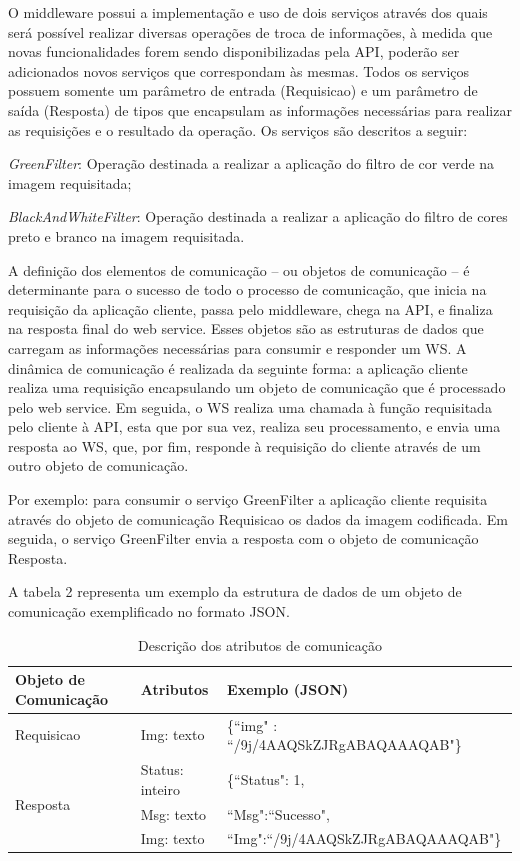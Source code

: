 \documentclass[12pt]{article}
\begin{document}
O middleware possui a implementação e uso de dois serviços através dos quais será possível realizar diversas operações de troca de informações, à medida que novas funcionalidades forem sendo disponibilizadas pela API, poderão ser adicionados novos serviços que correspondam às mesmas.
Todos os serviços possuem somente um parâmetro de entrada (Requisicao) e um parâmetro de saída (Resposta) de tipos que encapsulam as informações necessárias para realizar as requisições e o resultado da operação. Os serviços são descritos a seguir:


\textit{GreenFilter}: Operação destinada a realizar a aplicação do filtro de cor verde na imagem requisitada;

\textit{BlackAndWhiteFilter}: Operação destinada a realizar a aplicação do filtro de cores preto e branco na imagem requisitada.

A definição dos elementos de comunicação – ou objetos de comunicação – é
determinante para o sucesso de todo o processo de comunicação, que inicia na requisição da aplicação cliente, passa pelo middleware, chega na API, e finaliza na resposta final do web service. Esses objetos são as estruturas de dados que carregam as informações necessárias para consumir e responder um WS.
A dinâmica de comunicação é realizada da seguinte forma: a aplicação cliente realiza uma requisição encapsulando um objeto de comunicação que é processado pelo web service. Em seguida, o WS realiza uma chamada à função requisitada pelo cliente à API, esta que por sua vez, realiza seu processamento, e envia uma resposta ao WS, que, por fim, responde à requisição do cliente através de um outro objeto de comunicação.

Por exemplo: para consumir o serviço GreenFilter a aplicação cliente requisita através do objeto de comunicação Requisicao os dados da imagem codificada. Em seguida, o serviço GreenFilter envia a resposta com o objeto de comunicação Resposta.

A tabela 2 representa um exemplo da estrutura de dados de um objeto de
comunicação exemplificado no formato JSON.

\begin{table}[ht]
	\centering
	\caption{Descrição dos atributos de comunicação}
	\label{tab:Table2}
	\smallskip
	\begin{tabular}{ |l|l|l| }
		\hline
		Objeto de Comunicação & Atributos & Exemplo (JSON) \\ \hline
		Requisicao & Img: texto & \{“img" : “/9j/4AAQSkZJRgABAQAAAQAB"\} \\ \hline
		\multirow{3}{*}{Resposta} & Status: inteiro & \{“Status": 1, \\
		& Msg: texto & “Msg":“Sucesso", \\
		& Img: texto & “Img":“/9j/4AAQSkZJRgABAQAAAQAB"\} \\
		\hline
	\end{tabular}
\end{table}
\end{document}
